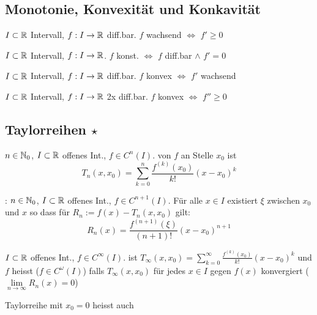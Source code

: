 \subsection{Monotonie, Konvexität und Konkavität}

\Satz $I \subset \mathbb{R}$ Intervall, $f: I \to \mathbb{R}$ diff.bar.
$f$ wachsend $\iff$ $f' \ge 0$

\Kor $I \subset \mathbb{R}$ Intervall, $f: I \to \mathbb{R}$.
$f$ konst. $\iff$ $f$ diff.bar $\land$ $f' = 0$

\Satz $I \subset \mathbb{R}$ Intervall, $f: I \to \mathbb{R}$ diff.bar.
$f$ konvex $\iff$ $f'$ wachsend

\Kor $I \subset \mathbb{R}$ Intervall, $f: I \to \mathbb{R}$ 2x diff.bar.
$f$ konvex $\iff$ $f'' \ge 0$

\subsection{Taylorreihen \texorpdfstring{$\star$}{*}}

\Def $n \in \mathbb{N}_0$, $I \subset \mathbb{R}$ offenes Int., $f \in C^n(I)$.  von $f$
an Stelle $x_0$ ist
$$T_n(x, x_0) = \sum_{k=0}^{n}\frac{f^{(k)}(x_0)}{k!}(x-x_0)^k$$ 

\Satz {}: $n \in \mathbb{N}_0$, $I \subset \mathbb{R}$ offenes Int., $f \in C^{n+1}(I)$. Für alle $x \in I$
existiert  $\xi$ zwischen $x_0$ und $x$ so dass für $R_n := f(x) - T_n(x, x_0)$ gilt:
$$R_n(x) = \frac{f^{(n+1)}(\xi)}{(n+1)!}(x-x_0)^{n+1}$$

\Def $I \subset \mathbb{R}$ offenes Int., $f \in C^\infty(I)$.  ist 
$T_\infty(x, x_0) = \sum_{k=0}^{\infty}\frac{f^{(k)}(x_0)}{k!}(x-x_0)^k$
und $f$ heisst  ($f \in C^\omega(I)$) falls $T_\infty(x, x_0)$ für jedes
$x \in I$ gegen $f(x)$ konvergiert ($\lim\limits_{n\to\infty} R_n(x) = 0$)

\Def Taylorreihe mit $x_0 = 0$ heisst auch 

